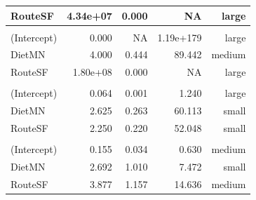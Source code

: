 \documentclass[
  12pt,
  letterpaper,
]{article}
\begin{document}
\begin{longtable}{l|rrrr}
RouteSF & 4.34e+07 & 0.000 & NA & large \\ 
\midrule\addlinespace[2.5pt]
\multicolumn{5}{l}{Liver} \\ 
\midrule\addlinespace[2.5pt]
(Intercept) &         0.000 & NA & 1.19e+179 & large \\ 
DietMN &         4.000 & 0.444 &                                                                                                                                                                                   89.442 & medium \\ 
RouteSF & 1.80e+08 & 0.000 & NA & large \\ 
\midrule\addlinespace[2.5pt]
\multicolumn{5}{l}{Paw} \\ 
\midrule\addlinespace[2.5pt]
(Intercept) &         0.064 & 0.001 &                                                                                                                                                                                    1.240 & large \\ 
DietMN &         2.625 & 0.263 &                                                                                                                                                                                   60.113 & small \\ 
RouteSF &         2.250 & 0.220 &                                                                                                                                                                                   52.048 & small \\ 
\midrule\addlinespace[2.5pt]
\multicolumn{5}{l}{Spleen} \\ 
\midrule\addlinespace[2.5pt]
(Intercept) &         0.155 & 0.034 &                                                                                                                                                                                    0.630 & medium \\ 
DietMN &         2.692 & 1.010 &                                                                                                                                                                                    7.472 & small \\ 
RouteSF &         3.877 & 1.157 &                                                                                                                                                                                   14.636 & medium \\ 
\bottomrule
\end{longtable}
\end{document}
